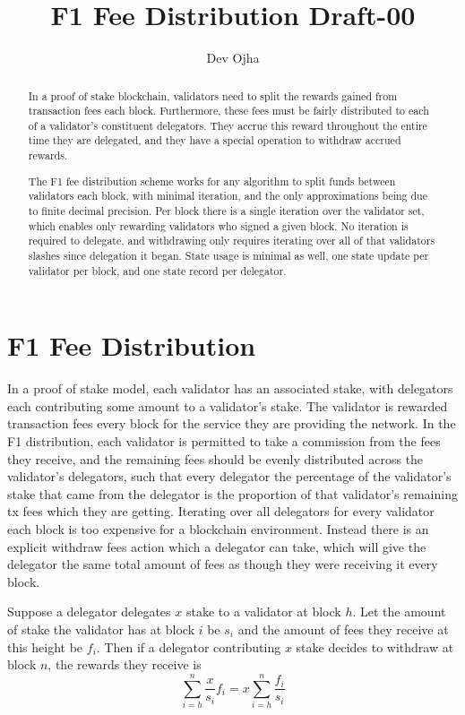 \documentclass[]{article}
\title{F1 Fee Distribution Draft-00}
\author{Dev Ojha}
\begin{document}
\maketitle

\begin{abstract}
	In a proof of stake blockchain, validators need to split the rewards gained from transaction fees each block. Furthermore, these fees must be fairly distributed to each of a validator's constituent delegators. They accrue this reward throughout the entire time they are delegated, and they have a special operation to withdraw accrued rewards.
	
	The F1 fee distribution scheme works for any algorithm to split funds between validators each block, with minimal iteration, and the only approximations being due to finite decimal precision. Per block there is a single iteration over the validator set, which enables only rewarding validators who signed a given block. No iteration is required to delegate, and withdrawing only requires iterating over all of that validators slashes since delegation it began. State usage is minimal as well, one state update per validator per block, and one state record per delegator.
\end{abstract}

\section{F1 Fee Distribution}

In a proof of stake model, each validator has an associated stake, with delegators each contributing some amount to a validator's stake.
The validator is rewarded transaction fees every block for the service they are providing the network.
In the F1 distribution, each validator is permitted to take a commission from the fees they receive, and the remaining fees should be evenly distributed across the validator's delegators, such that every delegator the percentage of the validator's stake that came from the delegator is the proportion of that validator's remaining tx fees which they are getting.
Iterating over all delegators for every validator each block is too expensive for a blockchain environment.
Instead there is an explicit withdraw fees action which a delegator can take, which will give the delegator the same total amount of fees as though they were receiving it every block.

Suppose a delegator delegates $x$ stake to a validator at block $h$.
Let the amount of stake the validator has at block $i$ be $s_i$ and the amount of fees they receive at this height be $f_i$.
Then if a delegator contributing $x$ stake decides to withdraw at block $n$, the rewards they receive is 
$$\sum_{i = h}^{n} \frac{x}{s_i}f_i = x \sum_{i = h}^{n} \frac{f_i}{s_i}$$
\end{document}
